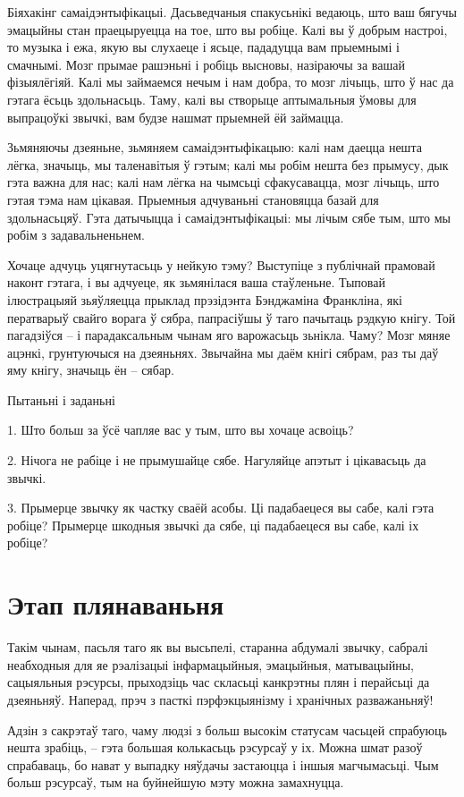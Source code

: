 Біяхакінг самаідэнтыфікацыі. Дасьведчаныя спакусьнікі ведаюць, што ваш бягучы эмацыйны стан праецыруецца на тое, што вы робіце. Калі вы ў добрым настроі, то музыка і ежа, якую вы слухаеце і ясьце, пададуцца вам прыемнымі і смачнымі. Мозг прымае рашэньні і робіць высновы, назіраючы за вашай фізыялёгіяй. Калі мы займаемся нечым і нам добра, то мозг лічыць, што ў нас да гэтага ёсьць здольнасьць. Таму, калі вы створыце аптымальныя ўмовы для выпрацоўкі звычкі, вам будзе нашмат прыемней ёй займацца.

Зьмяняючы дзеяньне, зьмяняем самаідэнтыфікацыю: калі нам даецца нешта лёгка, значыць, мы таленавітыя ў гэтым; калі мы робім нешта без прымусу, дык гэта важна для нас; калі нам лёгка на чымсьці сфакусавацца, мозг лічыць, што гэтая тэма нам цікавая. Прыемныя адчуваньні становяцца базай для здольнасьцяў. Гэта датычыцца і самаідэнтыфікацыі: мы лічым сябе тым, што мы робім з задавальненьнем.

Хочаце адчуць уцягнутасьць у нейкую тэму? Выступіце з публічнай прамовай наконт гэтага, і вы адчуеце, як зьмянілася ваша стаўленьне. Тыповай ілюстрацыяй зьяўляецца прыклад прэзідэнта Бэнджаміна Франкліна, які ператварыў свайго ворага ў сябра, папрасіўшы ў таго пачытаць рэдкую кнігу. Той пагадзіўся – і парадаксальным чынам яго варожасьць зьнікла. Чаму? Мозг мяняе ацэнкі, грунтуючыся на дзеяньнях. Звычайна мы даём кнігі сябрам, раз ты даў яму кнігу, значыць ён – сябар.

Пытаньні і заданьні

1. Што больш за ўсё чапляе вас у тым, што вы хочаце асвоіць?

2. Нічога не рабіце і не прымушайце сябе. Нагуляйце апэтыт і цікавасьць да звычкі.

3. Прымерце звычку як частку сваёй асобы. Ці падабаецеся вы сабе, калі гэта робіце? Прымерце шкодныя звычкі да сябе, ці падабаецеся вы сабе, калі іх робіце?


\section{Этап плянаваньня}

Такім чынам, пасьля таго як вы высьпелі, старанна абдумалі звычку, сабралі неабходныя для яе рэалізацыі інфармацыйныя, эмацыйныя, матывацыйны, сацыяльныя рэсурсы, прыходзіць час скласьці канкрэтны плян і перайсьці да дзеяньняў. Наперад, прэч з пасткі пэрфэкцыянізму і хранічных разважаньняў!

Адзін з сакрэтаў таго, чаму людзі з больш высокім статусам часьцей спрабуюць нешта зрабіць, – гэта большая колькасьць рэсурсаў у іх. Можна шмат разоў спрабаваць, бо нават у выпадку няўдачы застаюцца і іншыя магчымасьці. Чым больш рэсурсаў, тым на буйнейшую мэту можна замахнуцца.

